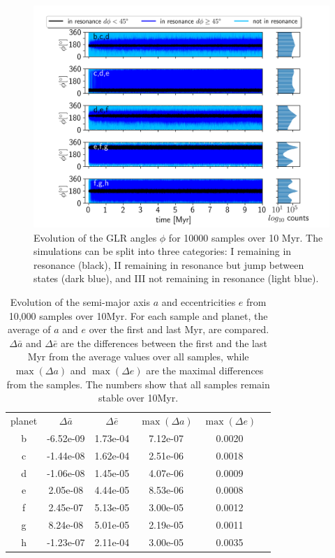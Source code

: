 \documentclass[fleqn,usenatbib]{mnras} %
\begin{document}
\begin{figure}
    \centering
    \includegraphics[width =\hsize]{figures/tlM.png}
    \caption{Evolution of the GLR angles $\phi$ for 10000 samples over 10 Myr. The simulations can be split into three categories: I remaining in resonance (black), II remaining in resonance but jump between states (dark blue), and III not remaining in resonance (light blue).}
    \label{fig:tlM}
\end{figure}

\begin{table}
\centering
\begin{tabular}{|c|c c c c c}
planet & $\Delta \bar{a}$ & $\Delta \bar{e}$ & $\max (\Delta a)$ & $\max(\Delta e)$ &\\ 
b      & -6.52e-09  & 1.73e-04 & 7.12e-07  & 0.0020 \\
c      & -1.44e-08  & 1.62e-04 & 2.51e-06  & 0.0018 \\
d      & -1.06e-08  & 1.45e-05 & 4.07e-06  & 0.0009 \\
e      &  2.05e-08  & 4.44e-05 & 8.53e-06  & 0.0008 \\
f      &  2.45e-07  & 5.13e-05 & 3.00e-05  & 0.0012 \\
g      &  8.24e-08  & 5.01e-05 & 2.19e-05  & 0.0011 \\
h      & -1.23e-07  & 2.11e-04 & 3.00e-05  & 0.0035

\end{tabular}
\caption{Evolution of the semi-major axis $a$ and eccentricities $e$ from 10,000 samples over 10Myr. For each sample and planet, the average of $a$ and $e$ over the first and last Myr, are compared.  $\Delta \bar{a}$ and  $\Delta \bar{e}$ are the differences between the first and the last Myr from the average values over all samples, while $\max (\Delta a)$ and $\max (\Delta e)$ are the maximal differences from the samples. The numbers show that all samples remain stable over 10Myr.}
\label{tab:averageAE}
\end{table}
\end{document}
